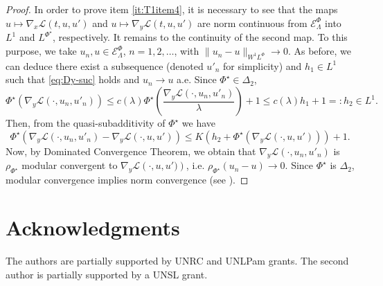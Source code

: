 \documentclass[twoside]{article}
\theoremstyle{remark}
\newcommand{\lphi}{L^{\Phi}}
\newcommand{\lpsi}{L^{\Phi^{\star}}}
\newcommand{\sobnor}{\|_{W^{1}\lphi}}
\newcommand{\domi}{\mathcal{E}^{\Phi}}
\renewcommand{\leq}{\leqslant}
\begin{document}
\begin{proof}
In order to prove item  \ref{it:T1item4}, it is necessary to see that the maps \linebreak[4]$u\mapsto \nabla_x\mathcal{L}(t,u,u')$  
and $u\mapsto \nabla_y\mathcal{L}(t,u,u')$  are norm continuous
from $\domi_{\Lambda} $ into $L^1$ and
 $\lpsi$, respectively.  
It remains to the continuity of the second map. 
To this purpose, we take  $u_n, u \in \domi_{\Lambda}$, $n=1,2,\dots$, with $\|u_n- u\sobnor\to 0$.  
As before, we can deduce there exist a subsequence (denoted $u'_n$ for simplicity) and $h_1 \in L^1$ such that \eqref{eq:Dy-suc} holds and $u_n \to u$ a.e.
 Since $\Phi^{\star}\in\Delta_2$, 
\begin{equation}
\Phi^{\star}(\nabla_y \mathcal{L}(\cdot,u_n,u'_n))\leq c(\lambda) \Phi^{\star}\left(\frac{\nabla_y \mathcal{L}(\cdot,u_n,u'_n)}{\lambda}\right)+1\leq c(\lambda)h_1+1=:h_2\in L^1.
\end{equation} 
Then, from the quasi-subadditivity of $\Phi^{\star}$ we have 
\[\Phi^{\star}\left(\nabla_y \mathcal{L}(\cdot,u_n,u'_n)-
\nabla_y \mathcal{L}(\cdot,u,u')\right)\leq K (h_2+\Phi^{\star}(\nabla_y \mathcal{L}(\cdot,u,u')))+1.\]
Now, by Dominated Convergence Theorem, we obtain that 
$\nabla_y \mathcal{L}(\cdot,u_n,u'_n)$ is $\rho_{\Phi^{\star}}$ modular convergent to $\nabla_y \mathcal{L}\left(\cdot,u,u')\right)$, i.e.
$\rho_{\Phi^{\star}}(u_n-u)\to 0$. 
Since $\Phi^{\star}$ is $\Delta_2$, modular convergence implies norm convergence (see \cite{Skaff1969}).
\end{proof}


\section*{Acknowledgments}
The authors are partially supported by  UNRC and UNLPam grants. The second author is  partially supported by a  UNSL grant. 




% 
 
 

\end{document}
